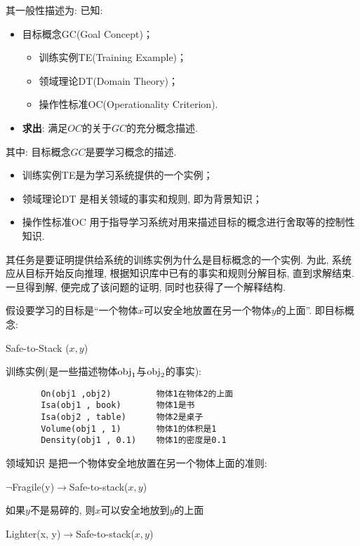 其一般性描述为: 已知:
\begin{itemize}
\item 目标概念GC(Goal Concept)；
   \begin{itemize}
         \item 训练实例TE(Training Example)；
         \item 领域理论DT(Domain Theory)；
         \item 操作性标准OC(Operationality Criterion).
   \end{itemize}
\item \textbf{求出}: 满足$OC$的关于$GC$的充分概念描述.
\end{itemize}
其中: 目标概念$GC$是要学习概念的描述.

\begin{itemize}
\item 训练实例TE是为学习系统提供的一个实例；
\item 领域理论DT 是相关领域的事实和规则, 即为背景知识；
\item 操作性标准OC 用于指导学习系统对用来描述目标的概念进行舍取等的控制性知识.
\end{itemize}

其任务是要证明提供给系统的训练实例为什么是目标概念的一个实例. 为此, 系统应从目标开始反向推理, 根据知识库中已有的事实和规则分解目标, 直到求解结束. 一旦得到解, 便完成了该问题的证明, 同时也获得了一个解释结构.

\begin{example}
假设要学习的目标是“一个物体$x$可以安全地放置在另一个物体$y$的上面”. 即目标概念:
\begin{center}
  Safe-to-Stack ($x, y$)
\end{center}

训练实例(是一些描述物体$\textup{obj}_1$与$\textup{obj}_2$的事实):
\begin{Verbatim}
       On(obj1 ,obj2)         物体1在物体2的上面
       Isa(obj1 , book)       物体1是书
       Isa(obj2 , table)      物体2是桌子
       Volume(obj1 , 1)       物体1的体积是1
       Density(obj1 , 0.1)    物体1的密度是0.1
\end{Verbatim}

领域知识   是把一个物体安全地放置在另一个物体上面的准则:
\begin{center}
  $\neg $Fragile(y)$\rightarrow$Safe-to-stack($x, y$)
\end{center}
\end{example}

如果$y$不是易碎的, 则$x$可以安全地放到$y$的上面
\begin{center}
  Lighter(x, y)$\rightarrow$Safe-to-stack($x, y$)
\end{center}

